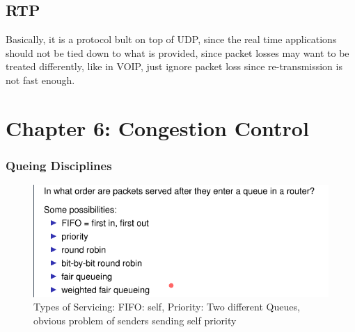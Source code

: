 \documentclass[11pt, a4paper]{article}
\begin{document}
\subsection{RTP}
Basically, it is a protocol bult on top of UDP, since the real time applications should not be tied down to what is provided, since packet losses may want to be treated differently, like in VOIP, just ignore packet loss since re-transmission is not fast enough.

\section{Chapter 6: Congestion Control}

\subsubsection{Queing Disciplines}
\begin{figure}[H]
    \centering
    \includegraphics{Pictures/Queues.png}
    \caption{Types of Servicing: FIFO: self, Priority: Two different Queues, obvious problem of senders sending self priority}
    \label{fig:my_label}
\end{figure}
\end{document}
